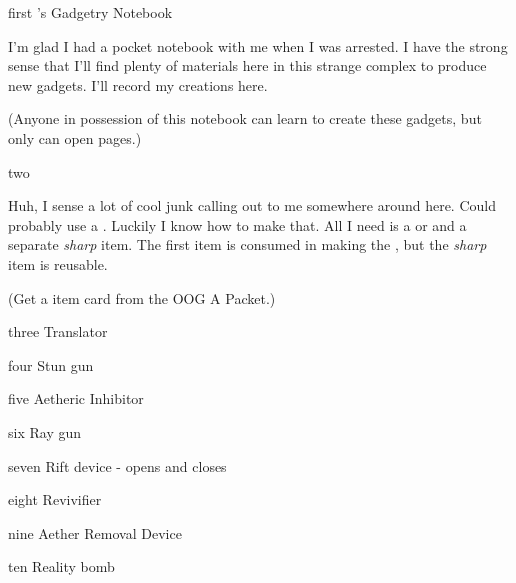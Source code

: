 \documentclass[notebook]{Silversiders} %
\begin{document}
\startnotebook{\nGadgetry{}}

\begin{page}{first}
\cIngenuity{}'s Gadgetry Notebook

I'm glad I had a pocket notebook with me when I was arrested. I have the strong sense that I'll find plenty of materials here in this strange complex to produce new gadgets. I'll record my creations here.

(Anyone in possession of this notebook can learn to create these gadgets, but only \cIngenuity{} can open pages.)
\end{page}

\begin{page}{two}

Huh, I sense a lot of cool junk calling out to me somewhere around here. Could probably use a \iLockpick{}. Luckily I know how to make that. All I need is a \iMetalShard{} or \iBrokenTrash{} and a separate \emph{sharp} item. The first item is consumed in making the \iLockpick{}, but the \emph{sharp} item is reusable.

(Get a \iLockpick{} item card from the OOG A Packet.)

\end{page}

\begin{page}{three}
Translator
\end{page}

\begin{page}{four}
Stun gun
\end{page}

\begin{page}{five}
Aetheric Inhibitor
\end{page}

\begin{page}{six}
Ray gun
\end{page}

\begin{page}{seven}
Rift device - opens and closes
\end{page}

\begin{page}{eight}
Revivifier
\end{page}

\begin{page}{nine}
Aether Removal Device
\end{page}

\begin{page}{ten}
Reality bomb
\end{page}

\endnotebook
\end{document}
